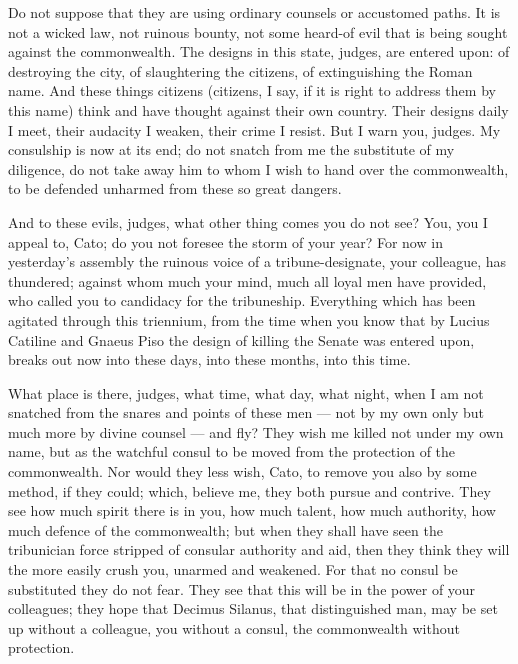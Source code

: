  Do not suppose that they are using ordinary counsels or accustomed paths. It is not a wicked law, not ruinous bounty, not some heard-of evil that is being sought against the commonwealth. The designs in this state, judges, are entered upon: of destroying the city, of slaughtering the citizens, of extinguishing the Roman name. And these things citizens (citizens, I say, if it is right to address them by this name) think and have thought against their own country. Their designs daily I meet, their audacity I weaken, their crime I resist. But I warn you, judges. My consulship is now at its end; do not snatch from me the substitute of my diligence, do not take away him to whom I wish to hand over the commonwealth, to be defended unharmed from these so great dangers.

 And to these evils, judges, what other thing comes you do not see? You, you I appeal to, Cato; do you not foresee the storm of your year? For now in yesterday's assembly the ruinous voice of a tribune-designate, your colleague, has thundered; against whom much your mind, much all loyal men have provided, who called you to candidacy for the tribuneship. Everything which has been agitated through this triennium, from the time when you know that by Lucius Catiline and Gnaeus Piso the design of killing the Senate was entered upon, breaks out now into these days, into these months, into this time.

 What place is there, judges, what time, what day, what night, when I am not snatched from the snares and points of these men --- not by my own only but much more by divine counsel --- and fly? They wish me killed not under my own name, but as the watchful consul to be moved from the protection of the commonwealth. Nor would they less wish, Cato, to remove you also by some method, if they could; which, believe me, they both pursue and contrive. They see how much spirit there is in you, how much talent, how much authority, how much defence of the commonwealth; but when they shall have seen the tribunician force stripped of consular authority and aid, then they think they will the more easily crush you, unarmed and weakened. For that no consul be substituted they do not fear. They see that this will be in the power of your colleagues; they hope that Decimus Silanus, that distinguished man, may be set up without a colleague, you without a consul, the commonwealth without protection.

